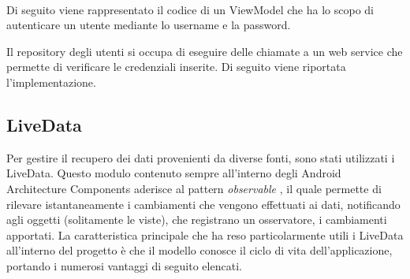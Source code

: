 \documentclass[12pt]{report}
\begin{document}
\\Di seguito viene rappresentato il codice di un ViewModel che ha lo scopo di autenticare un utente mediante lo username e la password.

Il repository degli utenti si occupa di eseguire delle chiamate a un web service che permette di verificare le credenziali inserite. Di seguito viene riportata l'implementazione.

\subsection{LiveData}
Per gestire il recupero dei dati provenienti da diverse fonti, sono stati utilizzati i LiveData. Questo modulo contenuto sempre all'interno degli Android Architecture Components aderisce al pattern \textit{observable} \cite{observer}, il quale permette di rilevare istantaneamente i cambiamenti che vengono effettuati ai dati, notificando agli oggetti (solitamente le viste), che registrano un osservatore, i cambiamenti apportati. La caratteristica principale che ha reso particolarmente utili i LiveData all'interno del progetto è che il modello conosce il ciclo di vita dell'applicazione, portando i numerosi vantaggi di seguito elencati.
\end{document}
